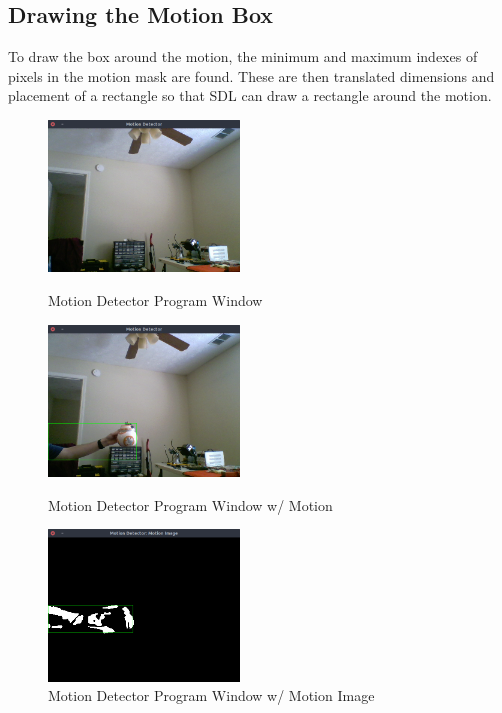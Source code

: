 \documentclass[journal]{IEEEtran}
\begin{document}
\subsection{Drawing the Motion Box}
To draw the box around the motion, the minimum and maximum indexes of pixels in the motion mask are found. These
are then translated dimensions and placement of a rectangle so that SDL can draw a rectangle around the motion.
\begin{figure}[t]
    \centering
    \begin{minipage}{0.4\textwidth}
    \centering
    \includegraphics[width=2in]{startup.png}
    \caption{Motion Detector Program Window}
    \label{fig:startup_window}
    \end{minipage}

    \begin{minipage}{0.4\textwidth}
    \centering
    \includegraphics[width=2in]{motion.png}
    \caption{Motion Detector Program Window w/ Motion}
    \label{fig:motion_box}
    \end{minipage}
    
    \begin{minipage}{0.4\textwidth}
    \centering
    \includegraphics[width=2in]{motion_image.png}
    \caption{Motion Detector Program Window w/ Motion Image}
    \label{fig:motion_image}
    \end{minipage}
\end{figure}
\end{document}
